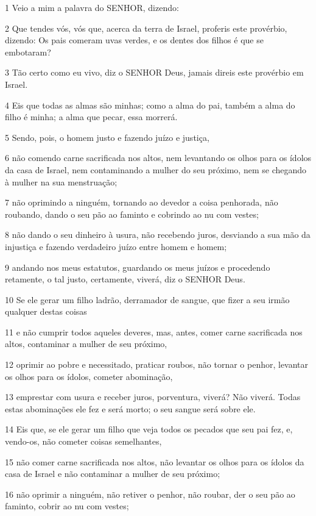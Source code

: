 \par 1 Veio a mim a palavra do SENHOR, dizendo:
\par 2 Que tendes vós, vós que, acerca da terra de Israel, proferis este provérbio, dizendo: Os pais comeram uvas verdes, e os dentes dos filhos é que se embotaram?
\par 3 Tão certo como eu vivo, diz o SENHOR Deus, jamais direis este provérbio em Israel.
\par 4 Eis que todas as almas são minhas; como a alma do pai, também a alma do filho é minha; a alma que pecar, essa morrerá.
\par 5 Sendo, pois, o homem justo e fazendo juízo e justiça,
\par 6 não comendo carne sacrificada nos altos, nem levantando os olhos para os ídolos da casa de Israel, nem contaminando a mulher do seu próximo, nem se chegando à mulher na sua menstruação;
\par 7 não oprimindo a ninguém, tornando ao devedor a coisa penhorada, não roubando, dando o seu pão ao faminto e cobrindo ao nu com vestes;
\par 8 não dando o seu dinheiro à usura, não recebendo juros, desviando a sua mão da injustiça e fazendo verdadeiro juízo entre homem e homem;
\par 9 andando nos meus estatutos, guardando os meus juízos e procedendo retamente, o tal justo, certamente, viverá, diz o SENHOR Deus.
\par 10 Se ele gerar um filho ladrão, derramador de sangue, que fizer a seu irmão qualquer destas coisas
\par 11 e não cumprir todos aqueles deveres, mas, antes, comer carne sacrificada nos altos, contaminar a mulher de seu próximo,
\par 12 oprimir ao pobre e necessitado, praticar roubos, não tornar o penhor, levantar os olhos para os ídolos, cometer abominação,
\par 13 emprestar com usura e receber juros, porventura, viverá? Não viverá. Todas estas abominações ele fez e será morto; o seu sangue será sobre ele.
\par 14 Eis que, se ele gerar um filho que veja todos os pecados que seu pai fez, e, vendo-os, não cometer coisas semelhantes,
\par 15 não comer carne sacrificada nos altos, não levantar os olhos para os ídolos da casa de Israel e não contaminar a mulher de seu próximo;
\par 16 não oprimir a ninguém, não retiver o penhor, não roubar, der o seu pão ao faminto, cobrir ao nu com vestes;
